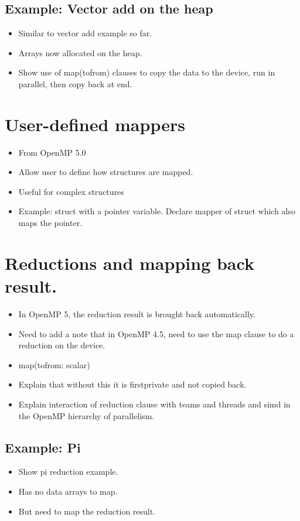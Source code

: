 \subsection{Example: Vector add on the heap}
\begin{itemize}
  \item Similar to vector add example so far.
  \item Arrays now allocated on the heap.
  \item Show use of map(tofrom) clauses to copy the data to the device, run in parallel, then copy back at end.
\end{itemize}

\section{User-defined mappers}
\begin{itemize}
  \item From OpenMP 5.0
  \item Allow user to define how structures are mapped.
  \item Useful for complex structures
  \item Example: struct with a pointer variable. Declare mapper of struct which also maps the pointer.
\end{itemize}

\section{Reductions and mapping back result.}
\begin{itemize}
  \item In OpenMP 5, the reduction result is brought back automatically.
  \item Need to add a note that in OpenMP 4.5, need to use the map clause to do a reduction on the device.
  \item map(tofrom: scalar)
  \item Explain that without this it is firstprivate and not copied back.
  \item Explain interaction of reduction clause with teams and threads and simd in the OpenMP hierarchy of parallelism.
\end{itemize}

\subsection{Example: Pi}
\begin{itemize}
  \item Show pi reduction example.
  \item Has no data arrays to map.
  \item But need to map the reduction result.
\end{itemize}

